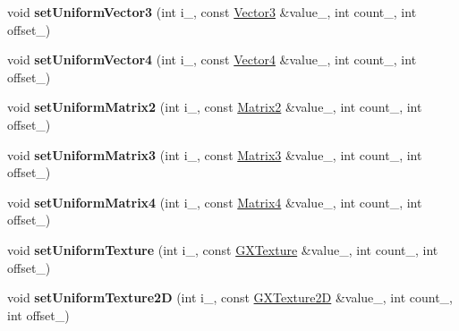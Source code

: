 \begin{DoxyCompactItemize}
\item 
void {\bfseries set\+Uniform\+Vector3} (int i\+\_\+, const \hyperlink{class_i_dream_sky_1_1_vector3}{Vector3} \&value\+\_\+, int count\+\_, int offset\+\_)\hypertarget{classi_dream_sky_1_1_g_x_shader_program2_a2fa99105a74fada4315ea57acccfe67b}{}\label{classi_dream_sky_1_1_g_x_shader_program2_a2fa99105a74fada4315ea57acccfe67b}

\item 
void {\bfseries set\+Uniform\+Vector4} (int i\+\_\+, const \hyperlink{class_i_dream_sky_1_1_vector4}{Vector4} \&value\+\_\+, int count\+\_, int offset\+\_)\hypertarget{classi_dream_sky_1_1_g_x_shader_program2_a148e53c01a29d23a410589091e39a79c}{}\label{classi_dream_sky_1_1_g_x_shader_program2_a148e53c01a29d23a410589091e39a79c}

\item 
void {\bfseries set\+Uniform\+Matrix2} (int i\+\_\+, const \hyperlink{class_i_dream_sky_1_1_matrix2}{Matrix2} \&value\+\_\+, int count\+\_, int offset\+\_)\hypertarget{classi_dream_sky_1_1_g_x_shader_program2_a1224559a33528cd9541e93a9b7a50c90}{}\label{classi_dream_sky_1_1_g_x_shader_program2_a1224559a33528cd9541e93a9b7a50c90}

\item 
void {\bfseries set\+Uniform\+Matrix3} (int i\+\_\+, const \hyperlink{class_i_dream_sky_1_1_matrix3}{Matrix3} \&value\+\_\+, int count\+\_, int offset\+\_)\hypertarget{classi_dream_sky_1_1_g_x_shader_program2_afd4427a09a6859895aac0f0aeb711f4f}{}\label{classi_dream_sky_1_1_g_x_shader_program2_afd4427a09a6859895aac0f0aeb711f4f}

\item 
void {\bfseries set\+Uniform\+Matrix4} (int i\+\_\+, const \hyperlink{class_i_dream_sky_1_1_matrix4}{Matrix4} \&value\+\_\+, int count\+\_, int offset\+\_)\hypertarget{classi_dream_sky_1_1_g_x_shader_program2_a169444cd669a21a68ab7cb23ca8b81e5}{}\label{classi_dream_sky_1_1_g_x_shader_program2_a169444cd669a21a68ab7cb23ca8b81e5}

\item 
void {\bfseries set\+Uniform\+Texture} (int i\+\_\+, const \hyperlink{class_i_dream_sky_1_1_g_x_texture}{G\+X\+Texture} \&value\+\_\+, int count\+\_, int offset\+\_)\hypertarget{classi_dream_sky_1_1_g_x_shader_program2_af8000444944f0f25985cc114d986d97f}{}\label{classi_dream_sky_1_1_g_x_shader_program2_af8000444944f0f25985cc114d986d97f}

\item 
void {\bfseries set\+Uniform\+Texture2D} (int i\+\_\+, const \hyperlink{class_i_dream_sky_1_1_g_x_texture2_d}{G\+X\+Texture2D} \&value\+\_\+, int count\+\_, int offset\+\_)\hypertarget{classi_dream_sky_1_1_g_x_shader_program2_a6970d66b8928b7d089c0f6cde5c2cb8a}{}\label{classi_dream_sky_1_1_g_x_shader_program2_a6970d66b8928b7d089c0f6cde5c2cb8a}


\end{DoxyCompactItemize}
